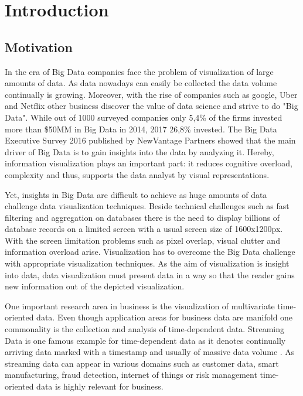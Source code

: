\chapter{Introduction}
\label{chap:introduction}

\section{Motivation}
In the era of Big Data companies face the problem of visualization of large amounts of data. As data nowadays can easily be collected the data volume continually is growing. Moreover, with the rise of companies such as google, Uber and Netflix other business discover the value of data science and strive to do "Big Data". While out of 1000 surveyed companies only 5,4\% of the firms invested more than \$50MM in Big Data in 2014, 2017 26,8\% invested. The Big Data Executive Survey 2016 published by NewVantage Partners showed that the main driver of Big Data is to gain insights into the data by analyzing it\cite{Bean2016}. Hereby, information visualization plays an important part: it reduces cognitive overload, complexity and thus, supports the data analyst by visual representations.
\par
 Yet, insights in Big Data are difficult to achieve as huge amounts of data challenge data visualization techniques. Beside technical challenges such as fast filtering and aggregation on databases there is the need to display billions of database records on a limited screen with a usual screen size of 1600x1200px. With the screen limitation problems such as pixel overlap, visual clutter and information overload arise. Visualization has to overcome the Big Data challenge with appropriate visualization techniques.
As the aim of visualization is insight into data, data visualization must present data in a way so that the reader gains new information out of the depicted visualization.
\par
One important research area in business is the visualization of multivariate time-oriented data. Even though application areas for business data are manifold one commonality is the collection and analysis of time-dependent data. Streaming Data is one famous example for time-dependent data as it denotes continually arriving data marked with a timestamp and usually of massive data volume \cite{o2002streaming} . As streaming data can appear in various domains such as customer data, smart manufacturing, fraud detection, internet of things or risk management time-oriented data is highly relevant for business.

